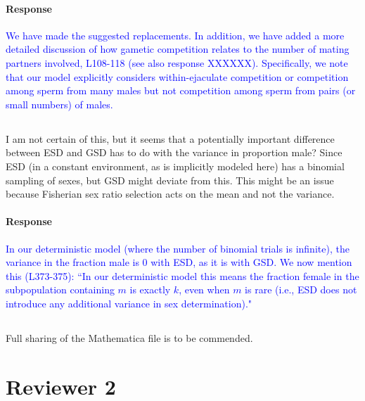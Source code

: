 \documentclass[10pt,letterpaper]{article}
\begin{document}
\noindent\paragraph{Response}
\textcolor{blue}{We have made the suggested replacements.
In addition, we have added a more detailed discussion of how gametic competition relates to the number of mating partners involved, L108-118 (see also response XXXXXX). 
Specifically, we note that our model explicitly considers within-ejaculate competition or competition among sperm from many males but not competition among sperm from pairs (or small numbers) of males. 
}

\noindent\subsection{}
I am not certain of this, but it seems that a potentially important difference between ESD and GSD has to do with the variance in proportion male? Since ESD (in a constant environment, as is implicitly modeled here) has a binomial sampling of sexes, but GSD might deviate from this.  This might be an issue because Fisherian sex ratio selection acts on the mean and not the variance.

\noindent\paragraph{Response}
\textcolor{blue}{In our deterministic model (where the number of binomial trials is infinite), the variance in the fraction male is 0 with ESD, as it is with GSD. 
We now mention this (L373-375): ``In our deterministic model this means the fraction female in the subpopulation containing $m$ is exactly $k$, even when $m$ is rare (i.e., ESD does not introduce any additional variance in sex determination)." 
 }

\noindent\subsection{}
Full sharing of the Mathematica file is to be commended.

\section{Reviewer 2}
\end{document}
